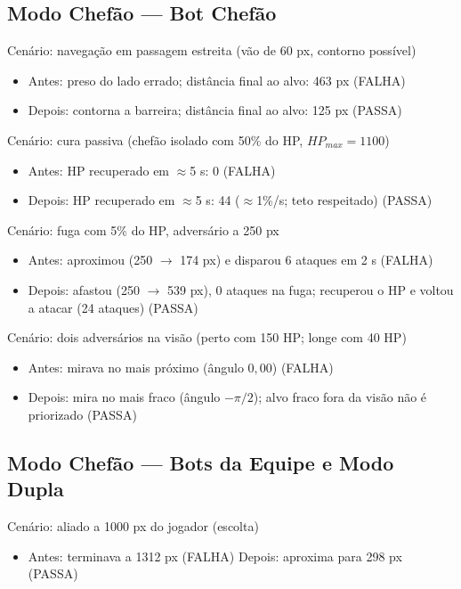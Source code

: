 \documentclass[a4paper,12pt]{article}
\begin{document}
\subsection*{Modo Chefão --- Bot Chefão}

Cenário: navegação em passagem estreita (vão de 60 px, contorno possível)
\begin{itemize}
  \item Antes: preso do lado errado; distância final ao alvo: 463 px (FALHA)
  \item Depois: contorna a barreira; distância final ao alvo: 125 px (PASSA)
\end{itemize}

\vspace{0.3cm}
Cenário: cura passiva (chefão isolado com 50\% do HP, $HP_{max} = 1100$)
\begin{itemize}
  \item Antes: HP recuperado em $\approx$5 s: 0 (FALHA)
  \item Depois: HP recuperado em $\approx$5 s: 44 ($\approx$1\%/s; teto respeitado) (PASSA)
\end{itemize}

\vspace{0.3cm}
Cenário: fuga com 5\% do HP, adversário a 250 px
\begin{itemize}
  \item Antes: aproximou (250 $\to$ 174 px) e disparou 6 ataques em 2 s (FALHA)
  \item Depois: afastou (250 $\to$ 539 px), 0 ataques na fuga; recuperou o HP e voltou a
        atacar (24 ataques) (PASSA)
\end{itemize}

\vspace{0.3cm}
Cenário: dois adversários na visão (perto com 150 HP; longe com 40 HP)
\begin{itemize}
  \item Antes: mirava no mais próximo (ângulo $0{,}00$) (FALHA)
  \item Depois: mira no mais fraco (ângulo $-\pi/2$); alvo fraco fora da visão não é
        priorizado (PASSA)
\end{itemize}

\subsection*{Modo Chefão --- Bots da Equipe e Modo Dupla}

Cenário: aliado a 1000 px do jogador (escolta)
\begin{itemize}
  \item Antes: terminava a 1312 px (FALHA) \quad Depois: aproxima para 298 px (PASSA)
\end{itemize}
\end{document}
